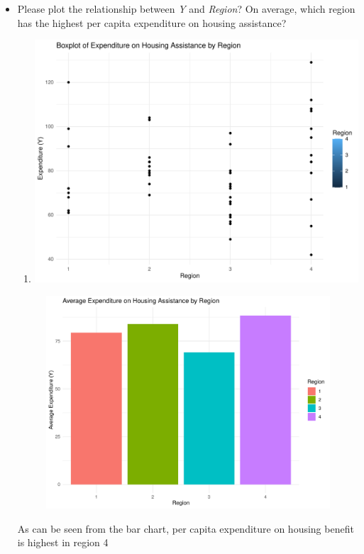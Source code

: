 \documentclass[12pt,letterpaper]{article}
\begin{document}
\begin{itemize}
		\newpage
		
		\item
		Please plot the relationship between \emph{Y} and \emph{Region}? On average, which region has the highest per capita expenditure on housing assistance?
		
		
		\begin{enumerate}
			\item[]
			\includegraphics[width=.85\textwidth]{boxplot.Y.Region_YuFan.pdf}
		\end{enumerate}
		
		
		\begin{figure}
			\includegraphics[width=.85\textwidth]{barplot.Y.Region_YuFan.pdf}
		\end{figure}
		
		As can be seen from the bar chart, per capita expenditure on housing benefit is highest in region 4\\
		

\end{itemize}
\end{document}
